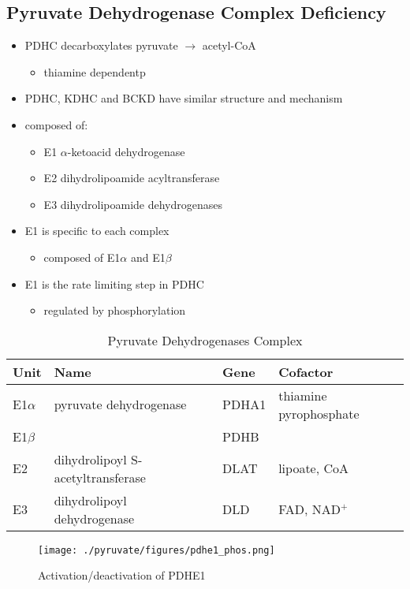 \documentclass{scrartcl}
\begin{document}
\subsection{Pyruvate Dehydrogenase Complex Deficiency}
\label{sec:orgcef34ad}
\begin{itemize}
\item PDHC decarboxylates pyruvate \(\to\) acetyl-CoA
\begin{itemize}
\item thiamine dependentp
\end{itemize}
\item PDHC, KDHC and BCKD have similar structure and mechanism
\item composed of:
\begin{itemize}
\item E1 \(\alpha\)-ketoacid dehydrogenase
\item E2 dihydrolipoamide acyltransferase
\item E3 dihydrolipoamide dehydrogenases
\end{itemize}
\item E1 is specific to each complex
\begin{itemize}
\item composed of E1\(\alpha\) and E1\(\beta\)
\end{itemize}
\item E1 is the rate limiting step in PDHC
\begin{itemize}
\item regulated by phosphorylation
\end{itemize}
\end{itemize}

\begin{table}[htbp]
\caption{\label{tab:org56d021e}
Pyruvate Dehydrogenases Complex}
\centering
\begin{tabular}{llll}
Unit & Name & Gene & Cofactor\\
\hline
E1\(\alpha\) & pyruvate dehydrogenase & PDHA1 & thiamine pyrophosphate\\
E1\(\beta\) &  & PDHB & \\
E2 & dihydrolipoyl  S-acetyltransferase & DLAT & lipoate, CoA\\
E3 & dihydrolipoyl dehydrogenase & DLD & FAD, NAD\(^{\text{+}}\)\\
\end{tabular}
\end{table}

\begin{figure}[htbp]
\centering
\texttt{[image: ./pyruvate/figures/pdhe1\_phos.png]}
\caption[pdhe1]{\label{fig:org3beab51}
Activation/deactivation of PDHE1}
\end{figure}
\end{document}
